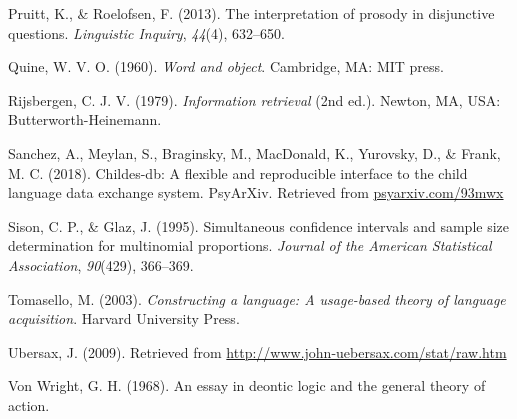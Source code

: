 \documentclass[,man,floatsintext]{apa6}
\begin{document}
\leavevmode\hypertarget{ref-pruitt2013interpretation}{}%
Pruitt, K., \& Roelofsen, F. (2013). The interpretation of prosody in disjunctive questions. \emph{Linguistic Inquiry}, \emph{44}(4), 632--650.

\leavevmode\hypertarget{ref-quine1960word}{}%
Quine, W. V. O. (1960). \emph{Word and object}. Cambridge, MA: MIT press.

\leavevmode\hypertarget{ref-Rijsbergen1979}{}%
Rijsbergen, C. J. V. (1979). \emph{Information retrieval} (2nd ed.). Newton, MA, USA: Butterworth-Heinemann.

\leavevmode\hypertarget{ref-sanchez2018childes}{}%
Sanchez, A., Meylan, S., Braginsky, M., MacDonald, K., Yurovsky, D., \& Frank, M. C. (2018). Childes-db: A flexible and reproducible interface to the child language data exchange system. PsyArXiv. Retrieved from \url{psyarxiv.com/93mwx}

\leavevmode\hypertarget{ref-sison1995simultaneous}{}%
Sison, C. P., \& Glaz, J. (1995). Simultaneous confidence intervals and sample size determination for multinomial proportions. \emph{Journal of the American Statistical Association}, \emph{90}(429), 366--369.

\leavevmode\hypertarget{ref-tomasello2003constructing}{}%
Tomasello, M. (2003). \emph{Constructing a language: A usage-based theory of language acquisition}. Harvard University Press.

\leavevmode\hypertarget{ref-ubersax2009}{}%
Ubersax, J. (2009). Retrieved from \url{http://www.john-uebersax.com/stat/raw.htm}

\leavevmode\hypertarget{ref-von1968essay}{}%
Von Wright, G. H. (1968). An essay in deontic logic and the general theory of action.
\end{document}
